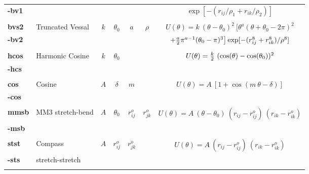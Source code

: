 \begin{enumerate}
\begin{table}[htbp]
\begin{centering}
\begin{tabular}{|l|l|c|c|c|c|c|}
{\bf -bv1} &                     &     &              &            &            &
$\exp[-(r_{ij}/\rho_{1} + r_{ik}/\rho_{2})]$ \\
           &                     &     &              &            &            & \\
{\bf bvs2} & Truncated Vessal \cite{smith-95a} & $k$ & $\theta_{0}$ & $a$ & $\rho$ &
$U(\theta) = k~(\theta-\theta_{0})^{2}~\big[ \theta^a (\theta+\theta_{0}-2\pi)^{2}$ \\
{\bf -bv2} &                     &     &              &            &            &
$+ {a \over 2} \pi^{a-1} (\theta_{0}-\pi)^{3}\big] \exp[-(r_{ij}^{8} + r_{ik}^{8})/\rho^{8}]$ \\
           &                     &     &              &            &            & \\
{\bf hcos} & Harmonic Cosine     & $k$ & $\theta_{0}$ &            &            &
$U(\theta) = {k \over 2}~(\cos(\theta) - \cos(\theta_{0}))^{2}$ \\
{\bf -hcs} &                     &     &              &            &            & \\
           &                     &     &              &            &            & \\
{\bf cos}  & Cosine              & $A$ & $\delta$     & $m$        &            &
$U(\theta) = A~[1+\cos(m~\theta-\delta)]$ \\
{\bf -cos} &                     &     &              &            &            & \\
           &                     &     &              &            &            & \\
{\bf mmsb} & MM3 stretch-bend \cite{allinger-89a} & $A$ & $\theta_{0}$ & $r_{ij}^{o}$ & $r_{jk}^{o}$ &
$U(\theta) = A~(\theta-\theta_{0})~(r_{ij} - r_{ij}^{o})~(r_{ik} - r_{ik}^{o})$ \\
{\bf -msb} &                     &     &              &            &            & \\
           &                     &     &              &            &            & \\
{\bf stst} & Compass \cite{sun-98a} & $A$ & $r_{ij}^{o}$ & $r_{jk}^{o}$ &        &
$U(\theta) = A~(r_{ij} - r_{ij}^{o})~(r_{ik} - r_{ik}^{o})$ \\
{\bf -sts} & stretch-stretch     &     &              &            &            & \\
           &                     &     &              &            &            & \\

\end{tabular}
\end{centering}
\end{table}
\end{enumerate}
